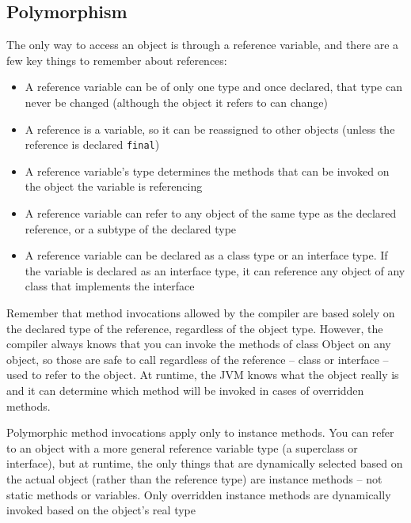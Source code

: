 \subsection{Polymorphism}
The only way to access an object is through a reference variable, and there are 
a few key things to remember about references:
\begin{itemize}
    \item A reference variable can be of only one type and once declared, that 
    type can never be changed (although the object it refers to can change)
    \item A reference is a variable, so it can be reassigned to other objects 
    (unless the reference is declared \verb#final#)
    \item A reference variable's type determines the methods that can be 
    invoked on the object the variable is referencing
    \item A reference variable can refer to any object of the same type as the 
    declared reference, or a subtype of the declared type
    \item A reference variable can be declared as a class type or an interface 
    type. If the variable is declared as an interface type, it can reference 
    any object of any class that implements the interface
\end{itemize}
Remember that method invocations allowed by the compiler are based solely on 
the declared type of the reference, regardless of the object type. However, the 
compiler always knows that you can invoke the methods of class Object on any 
object, so those are safe to call regardless of the reference -- class or 
interface -- used to refer to the object. At runtime, the JVM knows what the 
object really is and it can determine which method will be invoked in cases of 
overridden methods.

Polymorphic method invocations apply only to instance methods. You can refer to 
an object with a more general reference variable type (a superclass or 
interface), but at runtime, the only things that are dynamically selected based 
on the actual object (rather than the reference type) are instance methods -- 
not static methods or variables. Only overridden instance methods are 
dynamically invoked based on the object's real type

